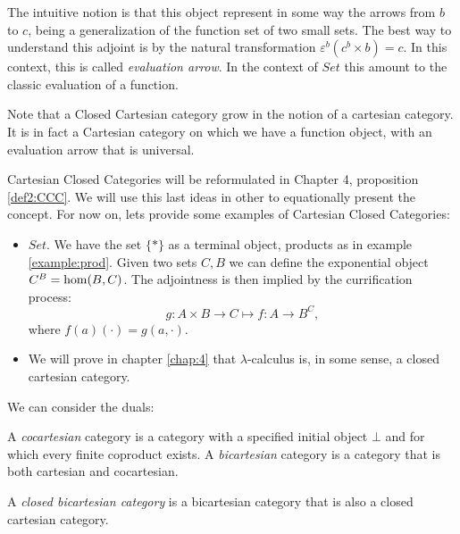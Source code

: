 \begin{definition}
\begin{itemize}
    The intuitive notion is that this object represent in some way the arrows from $b$ to $c$, being a generalization of the function set of two small sets. The best way to understand this adjoint is by the natural transformation $\varepsilon^b(c^b\times b) = c$. In this context, this is called \emph{evaluation arrow}. In the context of $Set$ this amount to the classic evaluation of a function.\\

  \end{itemize}
\end{definition}

\begin{remark}
  Note that a Closed Cartesian category grow in the notion of a cartesian category. It is in fact a Cartesian category on which we have a function object, with an evaluation arrow that is universal.
\end{remark}

Cartesian Closed Categories will be reformulated in Chapter 4, proposition \ref{def2:CCC}. We will use this last ideas in other to equationally present the concept. For now on, lets provide some examples of Cartesian Closed Categories:




\begin{example}
  \begin{itemize}
  \item $Set$. We have the set $\{*\}$ as a terminal object, products as in example \ref{example:prod}. Given two sets $C, B$ we can define the exponential object $C^B= \operatorname{hom} (B,C)$. The adjointness is then implied by the currification process:
    $$g: A\times B \to C \mapsto f: A \to B^C,$$
    where $f(a)(\cdot) = g(a,\cdot)$.
  \item We will prove in chapter \ref{chap:4} that $\lambda$-calculus is, in some sense, a closed cartesian category.
  \end{itemize}
\end{example}


We can consider the duals:

\begin{definition}
  A \emph{cocartesian} category is a category with a specified initial object $\bot$ and for which every finite coproduct exists. A \emph{bicartesian} category is a category that is both cartesian and cocartesian.
\end{definition}

\begin{definition}A \emph{closed bicartesian category} is a bicartesian category that is also a closed cartesian category.
\end{definition}

